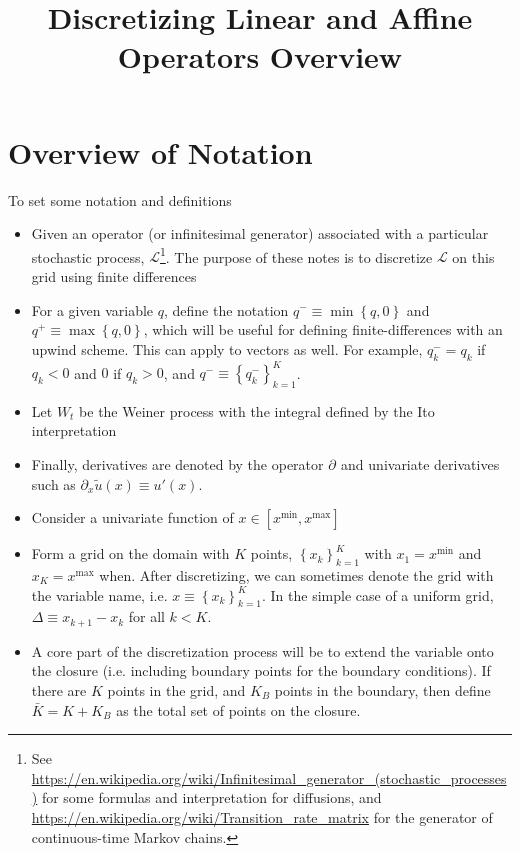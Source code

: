 \documentclass[11pt]{article}
\newcommand{\set}[1]{\ensuremath{\left\{{#1}\right\}}}
\newcommand{\D}[1][]{\ensuremath{\partial_{#1}}}
\newcommand{\A}{\ensuremath{\mathcal{A}}}
\begin{document}
	\title{Discretizing Linear and Affine Operators Overview}
	\author{}
	\date{}
	\maketitle
	\section{Overview of Notation}
	To set some notation and definitions
	\begin{itemize}
		\item Given an operator (or infinitesimal generator) associated with a particular stochastic process, $\mathcal{L}$\footnote{See \url{https://en.wikipedia.org/wiki/Infinitesimal_generator_(stochastic_processes)} for some formulas and interpretation for diffusions, and \url{https://en.wikipedia.org/wiki/Transition_rate_matrix} for the generator of continuous-time Markov chains.}.  The purpose of these notes is to discretize $\mathcal{L}$ on this grid using finite differences
		\item For a given variable $q$, define the notation $q^{-} \equiv \min\set{q,0}$ and $q^{+} \equiv \max\set{q,0}$, which will be useful for defining finite-differences with an upwind scheme.  This can apply to vectors as well. For example, $q_k^{-} = q_k$ if $q_k < 0$ and $0$ if $q_k > 0$, and $q^{-} \equiv \set{q^{-}_k}_{k=1}^{K}$.
		\item Let $W_t$ be the Weiner process with the integral defined by the Ito interpretation
		\item Finally, derivatives are denoted by the operator $\D$ and univariate derivatives such as $\D[x]\tilde{u}(x) \equiv u'(x)$.
		\item Consider a univariate function of $x \in [x^{\min}, x^{\max}]$
		\item Form a grid on the domain with $K$ points, $\set{x_k}_{k=1}^{K}$ with $x_1 = x^{\min}$ and $x_{K} = x^{\max}$ when. After discretizing, we can sometimes denote the grid with the variable name, i.e. $x \equiv \set{x_k}_{k=1}^{K}$. In the simple case of a uniform grid, $\Delta \equiv x_{k+1} - x_k$ for all $k < K$.
		\item A core part of the discretization process will be to extend the variable onto the closure (i.e. including boundary points for the boundary conditions).  If there are $K$ points in the grid, and $K_B$ points in the boundary, then define $\bar{K} = K + K_B$ as the total set of points on the closure.

\end{itemize}
\end{document}
